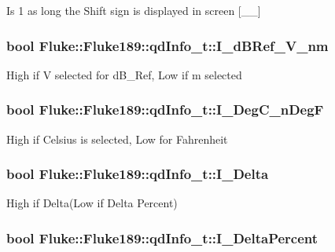\label{structFluke_1_1Fluke189_1_1qdInfo__t_ae4c25629fcefa361ba142764eb5bffdf}
Is 1 as long the Shift sign is displayed in screen \mbox{[}\_\-\_\-\mbox{]} \hypertarget{structFluke_1_1Fluke189_1_1qdInfo__t_a0f76472a62f21d1c44f0415064399213}{
\subsubsection[{I\_\-dBRef\_\-V\_\-nm}]{\setlength{\rightskip}{0pt plus 5cm}bool {\bf Fluke::Fluke189::qdInfo\_\-t::I\_\-dBRef\_\-V\_\-nm}}}
\label{structFluke_1_1Fluke189_1_1qdInfo__t_a0f76472a62f21d1c44f0415064399213}
High if V selected for dB\_\-Ref, Low if m selected \hypertarget{structFluke_1_1Fluke189_1_1qdInfo__t_ad91077e4cb12c59aa769cfe825917f41}{
\subsubsection[{I\_\-DegC\_\-nDegF}]{\setlength{\rightskip}{0pt plus 5cm}bool {\bf Fluke::Fluke189::qdInfo\_\-t::I\_\-DegC\_\-nDegF}}}
\label{structFluke_1_1Fluke189_1_1qdInfo__t_ad91077e4cb12c59aa769cfe825917f41}
High if Celsius is selected, Low for Fahrenheit \hypertarget{structFluke_1_1Fluke189_1_1qdInfo__t_ab4842e9293e5835bab8af588ba17a55c}{
\subsubsection[{I\_\-Delta}]{\setlength{\rightskip}{0pt plus 5cm}bool {\bf Fluke::Fluke189::qdInfo\_\-t::I\_\-Delta}}}
\label{structFluke_1_1Fluke189_1_1qdInfo__t_ab4842e9293e5835bab8af588ba17a55c}
High if Delta(Low if Delta Percent) \hypertarget{structFluke_1_1Fluke189_1_1qdInfo__t_a44210af5a4c0b632b88b551e6a92846d}{
\subsubsection[{I\_\-DeltaPercent}]{\setlength{\rightskip}{0pt plus 5cm}bool {\bf Fluke::Fluke189::qdInfo\_\-t::I\_\-DeltaPercent}}}
